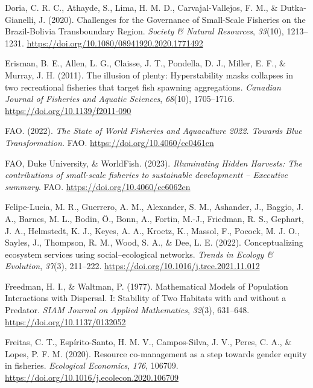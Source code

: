 \documentclass[
  12pt,
]{article}
\newlength{\cslhangindent}
\newenvironment{CSLReferences}[2] %
 {\begin{list}{}{%
  \setlength{\itemindent}{0pt}
  \setlength{\leftmargin}{0pt}
  \setlength{\parsep}{0pt}
  \ifodd #1
   \setlength{\leftmargin}{\cslhangindent}
   \setlength{\itemindent}{-1\cslhangindent}
  \fi
  \setlength{\itemsep}{#2\baselineskip}}}
 {\end{list}}
\begin{document}
\begin{CSLReferences}{1}{2}
Doria, C. R. C., Athayde, S., Lima, H. M. D., Carvajal-Vallejos, F. M., \& Dutka-Gianelli, J. (2020). Challenges for the {Governance} of {Small-Scale Fisheries} on the {Brazil-Bolivia Transboundary Region}. \emph{Society \& Natural Resources}, \emph{33}(10), 1213--1231. \url{https://doi.org/10.1080/08941920.2020.1771492}

Erisman, B. E., Allen, L. G., Claisse, J. T., Pondella, D. J., Miller, E. F., \& Murray, J. H. (2011). The illusion of plenty: Hyperstability masks collapses in two recreational fisheries that target fish spawning aggregations. \emph{Canadian Journal of Fisheries and Aquatic Sciences}, \emph{68}(10), 1705--1716. \url{https://doi.org/10.1139/f2011-090}

FAO. (2022). \emph{The {State} of {World Fisheries} and {Aquaculture} 2022. Towards {Blue Transformation}.} FAO. \url{https://doi.org/10.4060/cc0461en}

FAO, Duke University, \& WorldFish. (2023). \emph{Illuminating {Hidden Harvests}: The contributions of small-scale fisheries to sustainable developmentt -- {Executive} summary}. FAO. \url{https://doi.org/10.4060/cc6062en}

Felipe-Lucia, M. R., Guerrero, A. M., Alexander, S. M., Ashander, J., Baggio, J. A., Barnes, M. L., Bodin, Ö., Bonn, A., Fortin, M.-J., Friedman, R. S., Gephart, J. A., Helmstedt, K. J., Keyes, A. A., Kroetz, K., Massol, F., Pocock, M. J. O., Sayles, J., Thompson, R. M., Wood, S. A., \& Dee, L. E. (2022). Conceptualizing ecosystem services using social--ecological networks. \emph{Trends in Ecology \& Evolution}, \emph{37}(3), 211--222. \url{https://doi.org/10.1016/j.tree.2021.11.012}

Freedman, H. I., \& Waltman, P. (1977). Mathematical {Models} of {Population Interactions} with {Dispersal}. {I}: {Stability} of {Two Habitats} with and without a {Predator}. \emph{SIAM Journal on Applied Mathematics}, \emph{32}(3), 631--648. \url{https://doi.org/10.1137/0132052}

Freitas, C. T., Espírito-Santo, H. M. V., Campos-Silva, J. V., Peres, C. A., \& Lopes, P. F. M. (2020). Resource co-management as a step towards gender equity in fisheries. \emph{Ecological Economics}, \emph{176}, 106709. \url{https://doi.org/10.1016/j.ecolecon.2020.106709}


\end{CSLReferences}
\end{document}
